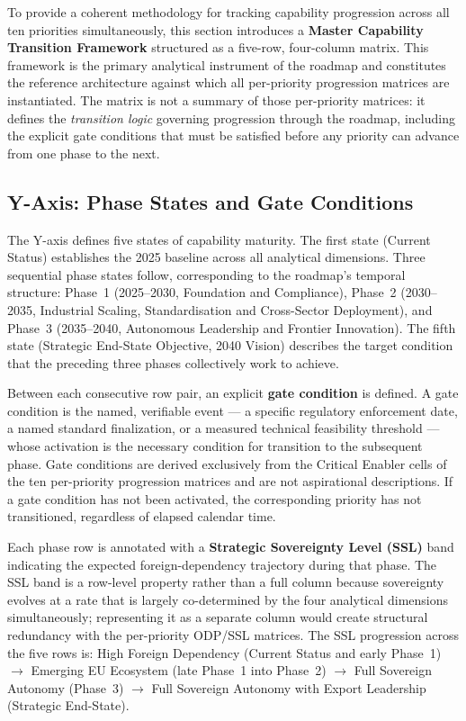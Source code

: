 To provide a coherent methodology for tracking capability progression across
all ten priorities simultaneously, this section introduces a \textbf{Master
Capability Transition Framework} structured as a five-row, four-column matrix.
This framework is the primary analytical instrument of the roadmap and
constitutes the reference architecture against which all per-priority
progression matrices are instantiated. The matrix is not a summary of those
per-priority matrices: it defines the \textit{transition logic} governing
progression through the roadmap, including the explicit gate conditions that
must be satisfied before any priority can advance from one phase to the next.

\subsection*{Y-Axis: Phase States and Gate Conditions}

The Y-axis defines five states of capability maturity. The first state
(Current Status) establishes the 2025 baseline across all analytical
dimensions. Three sequential phase states follow, corresponding to the
roadmap's temporal structure: Phase~1 (2025--2030, Foundation and
Compliance), Phase~2 (2030--2035, Industrial Scaling, Standardisation and
Cross-Sector Deployment), and Phase~3 (2035--2040, Autonomous Leadership
and Frontier Innovation). The fifth state (Strategic End-State Objective,
2040 Vision) describes the target condition that the preceding three phases
collectively work to achieve.

Between each consecutive row pair, an explicit \textbf{gate condition} is
defined. A gate condition is the named, verifiable event --- a specific
regulatory enforcement date, a named standard finalization, or a measured
technical feasibility threshold --- whose activation is the necessary
condition for transition to the subsequent phase. Gate conditions are
derived exclusively from the Critical Enabler cells of the ten per-priority
progression matrices and are not aspirational descriptions. If a gate
condition has not been activated, the corresponding priority has not
transitioned, regardless of elapsed calendar time.

Each phase row is annotated with a \textbf{Strategic Sovereignty Level (SSL)}
band indicating the expected foreign-dependency trajectory during that phase.
The SSL band is a row-level property rather than a full column because
sovereignty evolves at a rate that is largely co-determined by the four
analytical dimensions simultaneously; representing it as a separate column
would create structural redundancy with the per-priority ODP/SSL matrices.
The SSL progression across the five rows is: High Foreign Dependency
(Current Status and early Phase~1) $\rightarrow$ Emerging EU Ecosystem
(late Phase~1 into Phase~2) $\rightarrow$ Full Sovereign Autonomy
(Phase~3) $\rightarrow$ Full Sovereign Autonomy with Export Leadership
(Strategic End-State).


